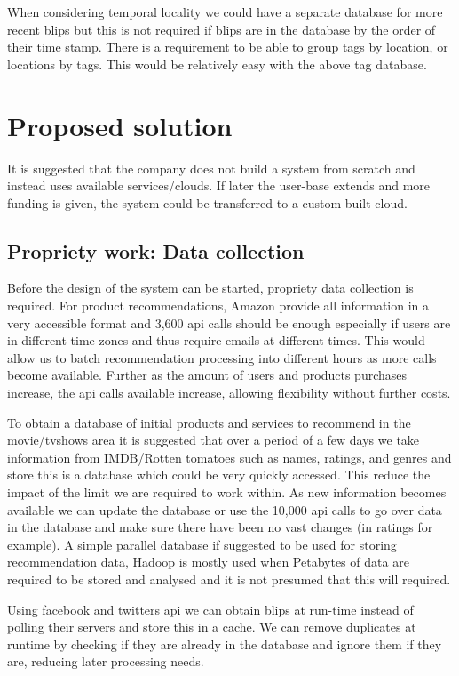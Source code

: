 \documentclass[11pt]{article}
\begin{document}
When considering temporal locality we could have a separate database for more recent blips but this is not required if blips are in the database by the order of their time stamp. There is a requirement to be able to group tags by location, or locations by tags. This would be relatively easy with the above tag database. 

\section{Proposed solution}
It is suggested that the company does not build a system from scratch and instead uses available services/clouds. If later the user-base extends and more funding is given, the system could be transferred to a custom built cloud. 

\subsection{Propriety work: Data collection}
Before the design of the system can be started, propriety data collection is required. For product recommendations, Amazon provide all information in a very accessible format and 3,600 api calls should be enough especially if users are in different time zones and thus require emails at different times. This would allow us to batch recommendation processing into different hours as more calls become available. Further as the amount of users and products purchases increase, the api calls available increase, allowing flexibility without further costs.

To obtain a database of initial products and services to recommend in the movie/tvshows area it is suggested that over a period of a few days we take information from IMDB/Rotten tomatoes such as names, ratings, and genres and store this is a database which could be very quickly accessed. This reduce the impact of the limit we are required to work within. As new information becomes available we can update the database or use the 10,000 api calls to go over data in the database and make sure there have been no vast changes (in ratings for example). A simple parallel database if suggested to be used for storing recommendation data, Hadoop is mostly used when Petabytes of data are required to be stored and analysed and it is not presumed that this will required.

Using facebook and twitters api we can obtain blips at run-time instead of polling their servers and store this in a cache. We can remove duplicates at runtime by checking if they are already in the database and ignore them if they are, reducing later processing needs.
\end{document}
